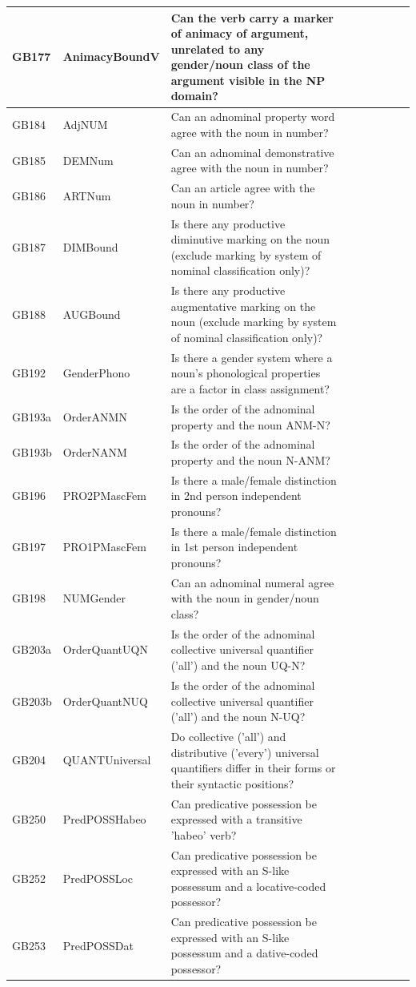 \documentclass[a4paper,10pt]{article} %
\begin{document}
\begin{landscape}
\begin{longtable}{| l | p{4cm}| p{12cm}|p{2cm}|p{2cm}|p{2cm}|p{2cm}|p{2cm}|p{2cm}|}
GB177 & AnimacyBoundV&Can the verb carry a marker of animacy of argument, unrelated to any gender/noun class of the argument visible in the NP domain?\\ \hline
GB184 & AdjNUM&Can an adnominal property word agree with the noun in number?\\ \hline
GB185 & DEMNum&Can an adnominal demonstrative agree with the noun in number?\\ \hline
GB186 & ARTNum&Can an article agree with the noun in number?\\ \hline
GB187 & DIMBound&Is there any productive diminutive marking on the noun (exclude marking by system of nominal classification only)?\\ \hline
GB188 & AUGBound&Is there any productive augmentative marking on the noun (exclude marking by system of nominal classification only)?\\ \hline
GB192 & GenderPhono&Is there a gender system where a noun's phonological properties are a factor in class assignment?\\ \hline
GB193a & OrderANMN&Is the order of the adnominal property and the noun ANM-N?\\ \hline
GB193b & OrderNANM&Is the order of the adnominal property and the noun N-ANM?\\ \hline
GB196 & PRO2PMascFem&Is there a male/female distinction in 2nd person independent pronouns?\\ \hline
GB197 & PRO1PMascFem&Is there a male/female distinction in 1st person independent pronouns?\\ \hline
GB198 & NUMGender&Can an adnominal numeral agree with the noun in gender/noun class?\\ \hline
GB203a & OrderQuantUQN&Is the order of the adnominal collective universal quantifier ('all') and the noun UQ-N?\\ \hline
GB203b & OrderQuantNUQ&Is the order of the adnominal collective universal quantifier ('all') and the noun N-UQ?\\ \hline
GB204 & QUANTUniversal&Do collective ('all') and distributive ('every') universal quantifiers differ in their forms or their syntactic positions?\\ \hline
GB250 & PredPOSSHabeo&Can predicative possession be expressed with a transitive 'habeo' verb?\\ \hline
GB252 & PredPOSSLoc&Can predicative possession be expressed with an S-like possessum and a locative-coded possessor?\\ \hline
GB253 & PredPOSSDat&Can predicative possession be expressed with an S-like possessum and a dative-coded possessor?\\ \hline

\end{longtable}
\end{landscape}
\end{document}
